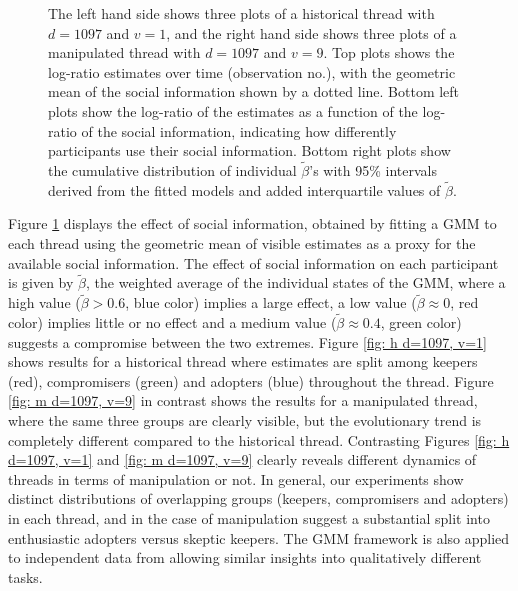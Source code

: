 \documentclass[a4paper,12pt]{article}
\begin{document}
\begin{figure}[!ht]
\begin{subfigure}[t]{.1\linewidth}
	\end{subfigure}
	\caption{\footnotesize The left hand side shows three plots of a historical thread with $d=1097$ and $v=1$, and the right hand side shows three plots of a manipulated thread with $d=1097$ and $v=9$. Top plots shows the log-ratio estimates over time (observation no.), with the geometric mean of the social information shown by a dotted line. Bottom left plots show the log-ratio of the estimates as a function of the log-ratio of the social information, indicating how differently participants use their social information. Bottom right plots show the cumulative distribution of individual $\tilde{\beta}$'s with 95\% intervals derived from the fitted models and added interquartile values of $\tilde{\beta}$.}
	\label{fig: social influence}
\end{figure}
Figure \ref{fig: social influence} displays the effect of social information, obtained by fitting a GMM to each thread using the geometric mean of visible estimates as a proxy for the available social information. The effect of social information on each participant is given by $\tilde{\beta}$, the weighted average of the individual states of the GMM, where a high value ($\tilde{\beta}>0.6$, blue color) implies a large effect, a low value ($\tilde{\beta}\approx 0$, red color) implies little or no effect and a medium value ($\tilde{\beta} \approx 0.4$, green color) suggests a compromise between the two extremes. Figure \ref{fig: h d=1097, v=1} shows results for a historical thread where estimates are split among keepers (red), compromisers (green) and adopters (blue) throughout the thread. Figure \ref{fig: m d=1097, v=9} in contrast shows the results for a manipulated thread, where the same three groups are clearly visible, but the evolutionary trend is completely different compared to the historical thread. Contrasting Figures \ref{fig: h d=1097, v=1} and \ref{fig: m d=1097, v=9} clearly reveals different dynamics of threads in terms of manipulation or not. In general, our experiments show distinct distributions of overlapping groups (keepers, compromisers and adopters) in each thread, and in the case of manipulation suggest a substantial split into enthusiastic adopters versus skeptic keepers. The GMM framework is also applied to independent data from \cite{jayles2017social} allowing similar insights into qualitatively different tasks. 

\setlength{\bibsep}{0.0pt}


\end{document}
